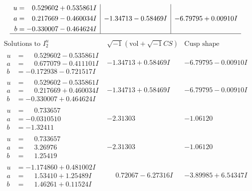 \documentclass[1p]{elsarticle_modified}
\theoremstyle{definition}
\newcommand{\I}{\sqrt{-1}}
\begin{document}
$$\begin{array}{c|c|c}
\begin{aligned}
u &= \phantom{-}0.529602 + 0.535861 I \\
a &= \phantom{-}0.217669 - 0.460034 I \\
b &= -0.330007 - 0.464624 I\end{aligned}
 & -1.34713 - 0.58469 I & -6.79795 + 0.00910 I\\
 \hline 
 \end{array}$$\newpage$$\begin{array}{c|c|c}  
\text{Solutions to }I^u_{2}& \I (\text{vol} + \sqrt{-1}CS) & \text{Cusp shape}\\
 \hline 
\begin{aligned}
u &= \phantom{-}0.529602 - 0.535861 I \\
a &= \phantom{-}0.677079 - 0.411101 I \\
b &= -0.172938 - 0.721517 I\end{aligned}
 & -1.34713 + 0.58469 I & -6.79795 - 0.00910 I \\ \hline\begin{aligned}
u &= \phantom{-}0.529602 - 0.535861 I \\
a &= \phantom{-}0.217669 + 0.460034 I \\
b &= -0.330007 + 0.464624 I\end{aligned}
 & -1.34713 + 0.58469 I & -6.79795 - 0.00910 I \\ \hline\begin{aligned}
u &= \phantom{-}0.733657\phantom{ +0.000000I} \\
a &= -0.0310510\phantom{ +0.000000I} \\
b &= -1.32411\phantom{ +0.000000I}\end{aligned}
 & -2.31303\phantom{ +0.000000I} & -1.06120\phantom{ +0.000000I} \\ \hline\begin{aligned}
u &= \phantom{-}0.733657\phantom{ +0.000000I} \\
a &= \phantom{-}3.26976\phantom{ +0.000000I} \\
b &= \phantom{-}1.25419\phantom{ +0.000000I}\end{aligned}
 & -2.31303\phantom{ +0.000000I} & -1.06120\phantom{ +0.000000I} \\ \hline\begin{aligned}
u &= -1.174860 + 0.481002 I \\
a &= \phantom{-}1.53410 + 1.25489 I \\
b &= \phantom{-}1.46261 + 0.11524 I\end{aligned}
 & \phantom{-}0.72067 - 6.27316 I & -3.89985 + 6.54347 I \\ \hline\begin{aligned}

\end{aligned}
\end{array}$$
\end{document}
